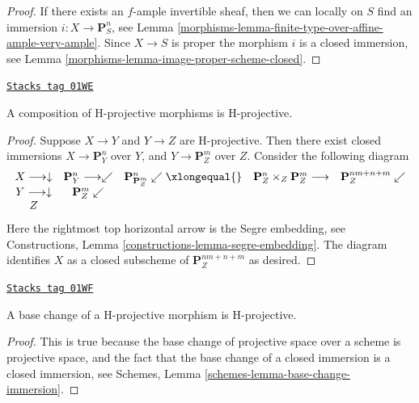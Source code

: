 \begin{proof}

If there exists an $f$-ample invertible sheaf, then we can locally
on $S$ find an immersion $i : X \to \mathbf{P}^n_S$, see
Lemma \ref{morphisms-lemma-finite-type-over-affine-ample-very-ample}. Since $X \to S$
is proper the morphism $i$ is a closed immersion, see
Lemma \ref{morphisms-lemma-image-proper-scheme-closed}.
\end{proof}

\begin{lemma}
\label{morphisms-lemma-H-projective-composition}
\href{https://stacks.math.columbia.edu/tag/01WE}{\texttt{Stacks tag 01WE}}

A composition of H-projective morphisms is H-projective.
\end{lemma}

\begin{proof}
Suppose $X \to Y$ and $Y \to Z$ are H-projective.
Then there exist closed immersions $X \to \mathbf{P}^n_Y$
over $Y$, and $Y \to \mathbf{P}^m_Z$ over $Z$.
Consider the following diagram
$$
\begin{array}{ccccc}X \longrightarrow\downarrow & \mathbf{P}^n_Y \longrightarrow\swarrow & \mathbf{P}^n_{\mathbf{P}^m_Z} \swarrow\xlongequal{} & \mathbf{P}^n_Z \times_Z \mathbf{P}^m_Z \longrightarrow & \mathbf{P}^{nm + n + m}_Z \swarrow \\ Y \longrightarrow\downarrow & \mathbf{P}^m_Z \swarrow &  &  &  \\ Z &  &  &  & \end{array}
$$
Here the rightmost top horizontal arrow is the Segre embedding,
see Constructions, Lemma \ref{constructions-lemma-segre-embedding}.
The diagram identifies
$X$ as a closed subscheme of $\mathbf{P}^{nm + n + m}_Z$ as desired.
\end{proof}

\begin{lemma}
\label{morphisms-lemma-H-projective-base-change}
\href{https://stacks.math.columbia.edu/tag/01WF}{\texttt{Stacks tag 01WF}}

A base change of a H-projective morphism is H-projective.
\end{lemma}

\begin{proof}
This is true because the base change of projective space
over a scheme is projective space, and the fact that the base
change of a closed immersion is a closed immersion, see
Schemes, Lemma \ref{schemes-lemma-base-change-immersion}.
\end{proof}

